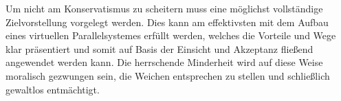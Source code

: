 Um nicht am Konservatismus zu scheitern muss eine möglichst vollständige Zielvorstellung vorgelegt werden. Dies kann am effektivsten mit dem Aufbau eines virtuellen Parallelsystemes erfüllt werden, welches die Vorteile und Wege klar präsentiert und somit auf Basis der Einsicht und Akzeptanz fließend angewendet werden kann. Die herrschende Minderheit wird auf diese Weise moralisch gezwungen sein, die Weichen entsprechen zu stellen und schließlich gewaltlos entmächtigt.
